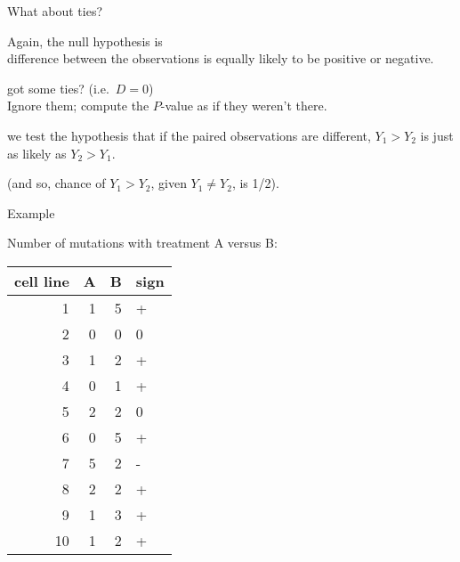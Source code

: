 \begin{frame}{What about ties?}

  Again, the null hypothesis is \\
  \hspace{2em}  difference between the observations is equally likely to be positive or negative.

    \vspace{2em}

     got some ties?  (i.e.\ $D=0$) \\
    \alert{Ignore them;} compute the $P$-value as if they weren't there.

    \vspace{2em}

     we test the hypothesis that \alert{if the paired observations are different}, $Y_1>Y_2$ is just as likely as $Y_2>Y_1$.  

    \vspace{1em}

    (and so, chance of $Y_1>Y_2$, given $Y_1 \neq Y_2$, is 1/2).

\end{frame}


\begin{frame}{Example}

        Number of mutations with treatment A versus B:
  \begin{center}
  \begin{tabular}{rrrl}
    \hline
  cell line & A & B & sign \\ 
    \hline
    1 &   1 &   5 & + \\ 
    2 &   0 &   0 & 0 \\ 
    3 &   1 &   2 & + \\ 
    4 &   0 &   1 & + \\ 
    5 &   2 &   2 & 0 \\ 
    6 &   0 &   5 & + \\ 
    7 &   5 &   2 & - \\ 
    8 &   2 &   2 & + \\ 
    9 &   1 &   3 & + \\ 
    10 &   1 &   2 & + \\ 
     \hline
  \end{tabular}
  \end{center}

\end{frame}



